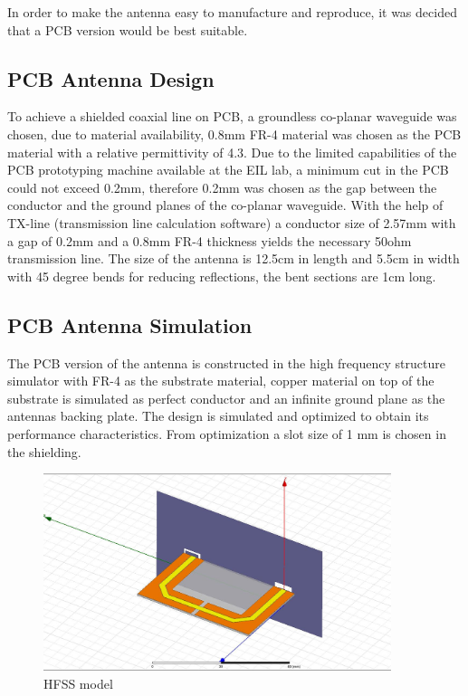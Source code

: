 In order to make the antenna easy to manufacture and reproduce, it was decided that a PCB version would be best suitable.

\subsection{PCB Antenna Design}

To achieve a shielded coaxial line on PCB, a groundless co-planar waveguide was chosen, due to material availability, 0.8mm FR-4 material was chosen as the PCB material with a relative permittivity of 4.3. Due to the limited capabilities of the PCB prototyping machine available at the EIL lab, a minimum cut in the PCB could not exceed 0.2mm, therefore 0.2mm was chosen as the gap between the conductor and the ground planes of the co-planar waveguide. With the help of TX-line (transmission line calculation software) a conductor size of 2.57mm with a gap of 0.2mm and a 0.8mm FR-4 thickness yields the necessary 50ohm transmission line. The size of the antenna is 12.5cm in length and 5.5cm in width with 45 degree bends for reducing reflections, the bent sections are 1cm long.

\subsection{PCB Antenna Simulation}

The PCB version of the antenna is constructed in the high frequency structure simulator with FR-4 as the substrate material, copper material on top of the substrate is simulated as perfect conductor and an infinite ground plane as the antennas backing plate. The design is simulated and optimized to obtain its performance characteristics. From optimization a slot size of 1 mm is chosen in the shielding.

\begin{figure}[h]
	\begin{center}
		\includegraphics[width=4in]{./images/Figure3.jpg}
		\caption{HFSS model}
		\label{fig:hfield_fig3}
	\end{center}
\end{figure}

